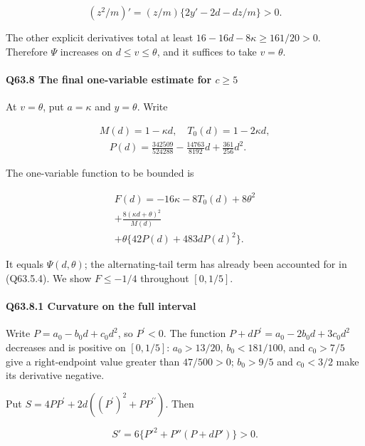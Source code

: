 \[
(z^2/m)'=(z/m)\{2y'-2d-dz/m\}>0.
\]

The other explicit derivatives total at least $16-16d-8\kappa\ge\allowbreak 161/20>\allowbreak 0$.
Therefore $\Psi$ increases on $d\le\allowbreak  v\le\allowbreak \theta$, and it suffices to take $v=\allowbreak \theta$.

\paragraph{Q63.8 The final one-variable estimate for $c\ge\allowbreak 5$}

At $v=\allowbreak \theta$, put $a=\allowbreak \kappa$ and $y=\allowbreak \theta$. Write

\[
\begin{gathered}
M(d)=1-\kappa d,\quad T_0(d)=1-2\kappa d,\\
\quad P(d)=\frac{342509}{524288}-\frac{14763}{8192}d+\frac{361}{256}d^2.
\end{gathered}
\]

The one-variable function to be bounded is

\[
\begin{gathered}
F(d)=-16\kappa-8T_0(d)+8\theta^2\\
+\frac{8(\kappa d+\theta)^2}{M(d)}\\
+\theta\{42P(d)+483dP(d)^2\}.
\end{gathered}\tag{Q63.8.1}\label{eq:Q63:Q63:8:1}
\]

It equals $\Psi(d,\allowbreak  \theta)$; the alternating-tail term has already been accounted for in (Q63.5.4).
We show $F\le\allowbreak -1/4$ throughout $[0,\allowbreak  1/5]$.

\paragraph{Q63.8.1 Curvature on the full interval}

Write $P=\allowbreak a_0-b_0d+c_0d^2$, so $P^\prime<\allowbreak 0$. The function
$P+dP^\prime=\allowbreak a_0-2b_0d+3c_0d^2$ decreases and is positive on $[0,\allowbreak  1/5]$:
$a_0>\allowbreak 13/20$, $b_0<\allowbreak 181/100$, and $c_0>\allowbreak 7/5$ give a right-endpoint value greater than $47/500>\allowbreak 0$;
$b_0>\allowbreak 9/5$ and $c_0<\allowbreak 3/2$ make its derivative negative.

Put $S=\allowbreak 4PP^\prime+2d((P^\prime)^2+PP^{\prime\prime})$. Then

\[
S'=6\{P'^2+P''(P+dP')\}>0.
\]

